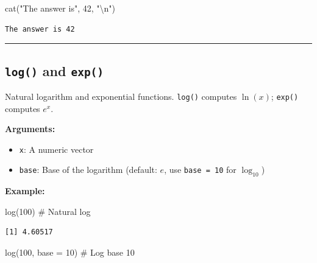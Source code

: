 \documentclass[
  letterpaper,
  DIV=11,
  numbers=noendperiod]{scrreprt}
\newenvironment{Shaded}{\begin{snugshade}}{\end{snugshade}}
\newcommand{\AttributeTok}[1]{\textcolor[rgb]{0.40,0.45,0.13}{#1}}
\newcommand{\CommentTok}[1]{\textcolor[rgb]{0.37,0.37,0.37}{#1}}
\newcommand{\DecValTok}[1]{\textcolor[rgb]{0.68,0.00,0.00}{#1}}
\newcommand{\FunctionTok}[1]{\textcolor[rgb]{0.28,0.35,0.67}{#1}}
\newcommand{\NormalTok}[1]{\textcolor[rgb]{0.00,0.23,0.31}{#1}}
\newcommand{\SpecialCharTok}[1]{\textcolor[rgb]{0.37,0.37,0.37}{#1}}
\newcommand{\StringTok}[1]{\textcolor[rgb]{0.13,0.47,0.30}{#1}}
\providecommand{\tightlist}{%
  \setlength{\itemsep}{0pt}\setlength{\parskip}{0pt}}
\begin{document}
\begin{Shaded}
\begin{Highlighting}[]
\FunctionTok{cat}\NormalTok{(}\StringTok{"The answer is"}\NormalTok{, }\DecValTok{42}\NormalTok{, }\StringTok{"}\SpecialCharTok{\textbackslash{}n}\StringTok{"}\NormalTok{)}
\end{Highlighting}
\end{Shaded}

\begin{verbatim}
The answer is 42 
\end{verbatim}

\begin{center}\rule{0.5\linewidth}{0.5pt}\end{center}

\subsection{\texorpdfstring{\texttt{log()} and
\texttt{exp()}}{log() and exp()}}\label{log-and-exp}

Natural logarithm and exponential functions. \texttt{log()} computes
\(\ln(x)\); \texttt{exp()} computes \(e^x\).

\textbf{Arguments:}

\begin{itemize}
\tightlist
\item
  \texttt{x}: A numeric vector
\item
  \texttt{base}: Base of the logarithm (default: \(e\), use
  \texttt{base\ =\ 10} for \(\log_{10}\))
\end{itemize}

\textbf{Example:}

\begin{Shaded}
\begin{Highlighting}[]
\FunctionTok{log}\NormalTok{(}\DecValTok{100}\NormalTok{)        }\CommentTok{\# Natural log}
\end{Highlighting}
\end{Shaded}

\begin{verbatim}
[1] 4.60517
\end{verbatim}

\begin{Shaded}
\begin{Highlighting}[]
\FunctionTok{log}\NormalTok{(}\DecValTok{100}\NormalTok{, }\AttributeTok{base =} \DecValTok{10}\NormalTok{)  }\CommentTok{\# Log base 10}
\end{Highlighting}
\end{Shaded}
\end{document}
